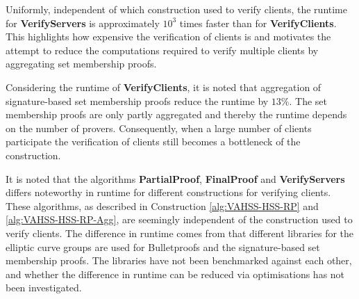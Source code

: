 Uniformly, independent of which construction used to verify clients, the runtime for \textbf{VerifyServers} is approximately $10^3$ times faster than for \textbf{VerifyClients}.  This highlights how expensive the verification of clients is and motivates the attempt to reduce the computations required to verify multiple clients by aggregating set membership proofs. 

Considering the runtime of \textbf{VerifyClients}, it is noted that aggregation of signature-based set membership proofs reduce the runtime by $13\%$. The set membership proofs are only partly aggregated and thereby the runtime depends on the number of provers. Consequently, when a large number of clients participate the verification of clients still becomes a bottleneck of the construction.


It is noted that the algorithms \textbf{PartialProof}, \textbf{FinalProof} and \textbf{VerifyServers} differs noteworthy in runtime for different constructions for verifying clients. These algorithms, as described in Construction \ref{alg:VAHSS-HSS-RP} and \ref{alg:VAHSS-HSS-RP-Agg}, are seemingly independent of the construction used to verify clients. The  difference in runtime comes from that different libraries for the elliptic curve groups are used for Bulletproofs and the signature-based set membership proofs. %
The libraries have not been benchmarked against each other, and whether the difference in runtime can be reduced via optimisations has not been investigated.







